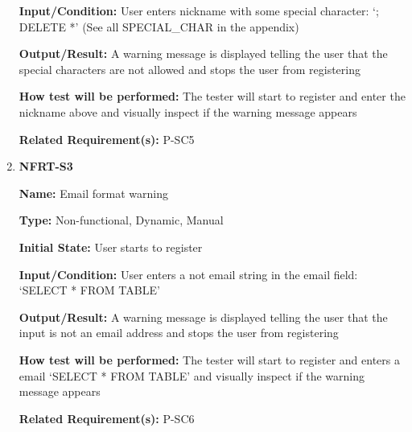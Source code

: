 \documentclass[12pt, titlepage]{article}
\begin{document}
\begin{enumerate}
\textbf{Input/Condition:} User enters nickname with some special character: `; DELETE *' (See all SPECIAL\_CHAR in the appendix)
					
\textbf{Output/Result:} A warning message is displayed telling the user that the special characters are not allowed and stops the user from registering

\textbf{How test will be performed:} The tester will start to register and enter the nickname above and visually inspect if the warning message appears

\textbf{Related Requirement(s):} P-SC5

\item{\textbf{NFRT-S3}}

\textbf{Name:} Email format warning

\textbf{Type:} Non-functional, Dynamic, Manual
					
\textbf{Initial State:} User starts to register
					
\textbf{Input/Condition:} User enters a not email string in the email field:
`SELECT * FROM TABLE'
					
\textbf{Output/Result:} A warning message is displayed telling the user that the input is not an email address and stops the user from registering

\textbf{How test will be performed:} The tester will start to register and enters a email `SELECT * FROM TABLE' and visually inspect if the warning message appears

\textbf{Related Requirement(s):} P-SC6
\end{enumerate}
\end{document}
